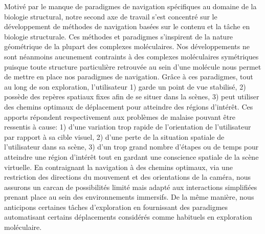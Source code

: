 Motivé par le manque de paradigmes de navigation spécifiques au domaine de la biologie structural, notre second axe de travail s'est concentré sur le développement de méthodes de navigation basées sur le contenu et la tâche en biologie structurale. Ces méthodes et paradigmes s'inspirent de la nature géométrique de la plupart des complexes moléculaires. Nos développements ne sont néanmoins aucunement contraints à des complexes moléculaires symétriques puisque toute structure particulière retrouvée au sein d'une molécule nous permet de mettre en place nos paradigmes de navigation. Grâce à ces paradigmes, tout au long de son exploration, l'utilisateur 1) garde un point de vue stabilisé, 2) possède des repères spatiaux fixes afin de se situer dans la scènes, 3) peut utiliser des chemins optimaux de déplacement pour atteindre des régions d’intérêt. Ces apports répondent respectivement aux problèmes de malaise pouvant être ressentis à cause: 1) d'une variation trop rapide de l'orientation de l'utilisateur par rapport à sa cible visuel, 2) d'une perte de la situation spatiale de l'utilisateur dans sa scène, 3) d'un trop grand nombre d'étapes ou de temps pour atteindre une région d'intérêt tout en gardant une conscience spatiale de la scène virtuelle. En contraignant la navigation à des chemins optimaux, via une restriction des directions du mouvement et des orientations de la caméra, nous assurons un carcan de possibilités limité mais adapté aux interactions simplifiées prenant place au sein des environnements immersifs. De la même manière, nous anticipons certaines tâches d'exploration en fournissant des paradigmes automatisant certains déplacements considérés comme habituels en exploration moléculaire.

